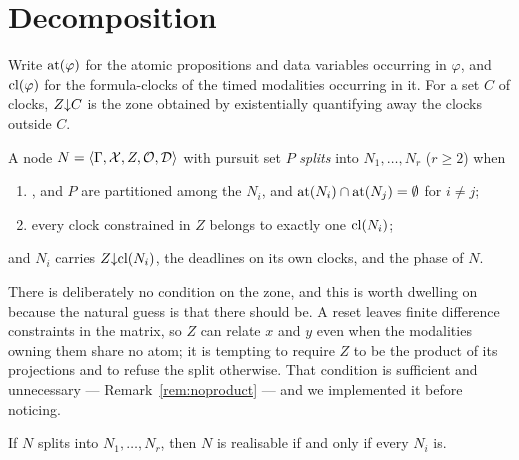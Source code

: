 \section{Decomposition}
\label{sec:theory}

Write $\mathrm{at}(\varphi)$ for the atomic propositions and data variables occurring
in $\varphi$, and $\mathrm{cl}(\varphi)$ for the formula-clocks of the timed
modalities occurring in it. For a set $C$ of clocks, $Z{\downarrow}C$ is the zone
obtained by existentially quantifying away the clocks outside $C$.

\begin{definition}[Split]\label{def:split}
A node $N=\langle \Gamma,\mathcal{X},Z,\mathcal{O},\mathcal{D}\rangle$ with pursuit set $P$ \emph{splits}
into $N_1,\dots,N_r$ ($r\ge 2$) when
\begin{enumerate}[label=\textup{(S\arabic*)},ref=\textup{(S\arabic*)}]
\item\label{S1} \Gam, \Ctx and $P$ are partitioned among the $N_i$, and
      $\mathrm{at}(N_i)\cap\mathrm{at}(N_j)=\emptyset$ for $i\ne j$;
\item\label{S2} every clock constrained in $Z$ belongs to exactly one
      $\mathrm{cl}(N_i)$;
\end{enumerate}
and $N_i$ carries $Z{\downarrow}\mathrm{cl}(N_i)$, the deadlines on its own clocks, and
the phase of $N$.
\end{definition}

There is deliberately no condition on the zone, and this is worth dwelling on
because the natural guess is that there should be. A reset leaves finite
difference constraints in the matrix, so $Z$ can relate $x$ and $y$ even when
the modalities owning them share no atom; it is tempting to require $Z$ to be
the product of its projections and to refuse the split otherwise. That condition
is sufficient and unnecessary --- Remark~\ref{rem:noproduct} --- and we
implemented it before noticing.

\begin{theorem}[Decomposition]\label{thm:decomp}
If $N$ splits into $N_1,\dots,N_r$, then $N$ is realisable if and only if every
$N_i$ is.
\end{theorem}

